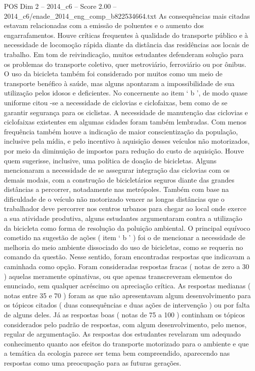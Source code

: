 \begin{textsample}{POS Dim 2 – 2014\_c6 – Score 2.00 – 2014\_c6/enade\_2014\_eng\_comp\_b822534664.txt}
As consequências mais citadas estavam relacionadas com a emissão de poluentes e o aumento dos engarrafamentos.
Houve críticas frequentes à qualidade do transporte público e à necessidade de locomoção rápida diante da distância das residências aos locais de trabalho.
Em tom de reivindicação, muitos estudantes defenderam solução para os problemas do transporte coletivo, quer metroviário, ferroviário ou por ônibus.
O uso da bicicleta também foi considerado por muitos como um meio de transporte benéfico à saúde, mas alguns apontaram a impossibilidade de sua utilização pelos idosos e deficientes.
No concernente ao item ‘ b ’, de modo quase uniforme citou -se a necessidade de ciclovias e ciclofaixas, bem como de se garantir segurança para os ciclistas.
A necessidade de manutenção das ciclovias e ciclofaixas existentes em algumas cidades foram também lembradas.
Com menos frequência também houve a indicação de maior conscientização da população, inclusive pela mídia, e pelo incentivo à aquisição desses veículos não motorizados, por meio da diminuição de impostos para redução do custo de aquisição.
Houve quem sugerisse, inclusive, uma política de doação de bicicletas.
Alguns mencionaram a necessidade de se assegurar integração das ciclovias com os demais modais, com a construção de bicicletários seguros diante das grandes distâncias a percorrer, notadamente nas metrópoles.
Também com base na dificuldade de o veículo não motorizado vencer as longas distâncias que o trabalhador deve percorrer nos centros urbanos para chegar ao local onde exerce a sua atividade produtiva, alguns estudantes argumentaram contra a utilização da bicicleta como forma de resolução da poluição ambiental.
O principal equívoco cometido na sugestão de ações ( item ‘ b ’ ) foi o de mencionar a necessidade de melhoria do meio ambiente dissociado do uso de bicicletas, como se requeria no comando da questão.
Nesse sentido, foram encontradas respostas que indicavam a caminhada como opção.
Foram consideradas respostas fracas ( notas de zero a 30 ) aquelas meramente opinativas, ou que apenas transcreveram elementos do enunciado, sem qualquer acréscimo ou apreciação crítica.
As respostas medianas ( notas entre 35 e 70 ) foram as que não apresentavam algum desenvolvimento para os tópicos citados ( duas consequências e duas ações de intervenção ) ou por falta de alguns deles.
Já as respostas boas ( notas de 75 a 100 ) continham os tópicos considerados pelo padrão de respostas, com algum desenvolvimento, pelo menos, regular de argumentação.
As respostas dos estudantes revelaram um adequado conhecimento quanto aos efeitos do transporte motorizado para o ambiente e que a temática da ecologia parece ser tema bem compreendido, aparecendo nas respostas como uma preocupação para as futuras gerações.

\end{textsample}
